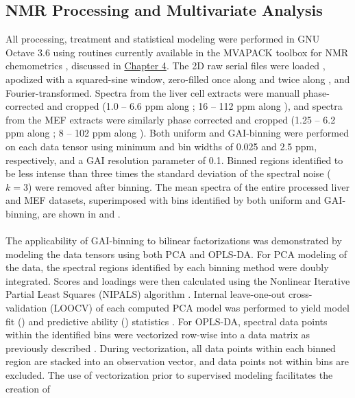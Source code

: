 \subsection{NMR Processing and Multivariate Analysis}

\begin{doublespace}
All processing, treatment and statistical modeling were performed in GNU
Octave 3.6 \cite{eaton2008} using routines currently available in the MVAPACK
toolbox for NMR chemometrics \cite{worley:acscb2014}, discussed in
\hyperlink{chapter.4}{Chapter 4}. The 2D raw serial files were loaded
\cite{delaglio:jbnmr1995}, apodized with a squared-sine window,
zero-filled once along \hnmr{} and twice along \cnmr{}, and
Fourier-transformed. Spectra from the liver cell extracts were manuall
phase-corrected and cropped (1.0 -- 6.6 ppm along \hnmr{}; 16 -- 112 ppm
along \cnmr{}), and spectra from the MEF extracts were similarly phase
corrected and cropped (1.25 -- 6.2 ppm along \hnmr{}; 8 -- 102 ppm
along \cnmr{}). Both uniform and GAI-binning were performed on each data tensor
using minimum \hnmr{} and \cnmr{} bin widths of 0.025 and 2.5
ppm, respectively, and a GAI resolution parameter of 0.1. Binned regions
identified to be less intense than three times the standard deviation of the
spectral noise ($k = 3$) were removed after binning. The mean spectra of the
entire processed liver and MEF datasets, superimposed with bins identified by
both uniform and GAI-binning, are shown in  and
.
\\\\
The applicability of GAI-binning to bilinear factorizations was demonstrated
by modeling the data tensors using both PCA and OPLS-DA. For PCA modeling of
the data, the spectral regions identified by each binning method were doubly
integrated. Scores and loadings were then calculated using the Nonlinear
Iterative Partial Least Squares (NIPALS) algorithm
\cite{jolliffe2002}. Internal leave-one-out cross-validation (LOOCV)
of each computed PCA model was performed to yield model fit (\rsqx{}) and
predictive ability (\qsq{}) statistics
\cite{krzanowski:biom1987,eshghi:cils2014}. For OPLS-DA, spectral data
points within the identified bins were vectorized row-wise into a data matrix
as previously described \cite{hedenstrom:cils2008}. During
vectorization, all data points within each binned region are stacked into an
observation vector, and data points not within bins are excluded. The use of
vectorization prior to supervised modeling facilitates the creation of

\end{doublespace}
